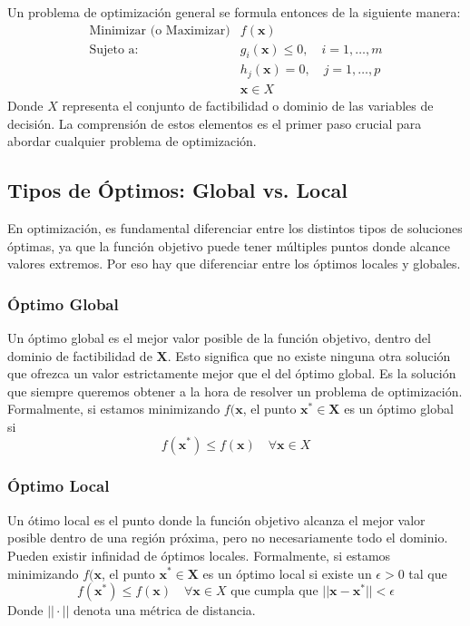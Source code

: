 \documentclass[12pt,a4paper]{book}
\begin{document}
Un problema de optimización general se formula entonces de la siguiente manera:
$$
\begin{array}{ll}
\text{Minimizar (o Maximizar)} & f(\mathbf{x}) \\
\text{Sujeto a:} & g_i(\mathbf{x}) \le 0, \quad i = 1, \ldots, m \\
& h_j(\mathbf{x}) = 0, \quad j = 1, \ldots, p \\
& \mathbf{x} \in X
\end{array}
$$
Donde $X$ representa el conjunto de factibilidad o dominio de las variables de decisión. La comprensión de estos elementos es el primer paso crucial para abordar cualquier problema de optimización.

\subsection{Tipos de Óptimos: Global vs. Local}

En optimización, es fundamental diferenciar entre los distintos tipos de soluciones óptimas, ya que la función objetivo puede tener múltiples puntos donde alcance valores extremos. Por eso hay que diferenciar entre los óptimos locales y globales.

\subsubsection{Óptimo Global}
Un óptimo global es el mejor valor posible de la función objetivo, dentro del dominio de factibilidad de $\mathbf{X}$. Esto significa que no existe ninguna otra solución que ofrezca un valor estrictamente mejor que el del óptimo global. Es la solución que siempre queremos obtener a la hora de resolver un problema de optimización. 
Formalmente, si estamos minimizando $f(\mathbf{x}$, el punto $\mathbf{x}^* \in \mathbf{X}$ es un óptimo global si
$$f(\mathbf{x}^*)\leq f(\mathbf{x}) \quad \forall \mathbf{x}\in X$$

\subsubsection{Óptimo Local}

Un ótimo local es el punto donde la función objetivo alcanza el mejor valor posible dentro de una región próxima, pero no necesariamente todo el dominio. Pueden existir infinidad de óptimos locales.
Formalmente, si estamos minimizando $f(\mathbf{x}$, el punto $\mathbf{x}^* \in \mathbf{X}$ es un óptimo local si existe un $\epsilon>0$ tal que
$$f(\mathbf{x}^*)\leq f(\mathbf{x}) \quad \forall \mathbf{x}\in X \text{ que cumpla que }||\mathbf{x}-\mathbf{x}^*||<\epsilon$$
Donde $||\cdot||$ denota una métrica de distancia.
\end{document}
